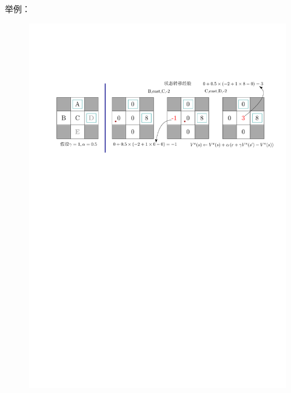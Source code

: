 \begin{example}
    举例：
    \begin{figure}[H]
        \centering
        \includegraphics[width = .8\textwidth]{image/时序差分学习.pdf}
    \end{figure}
\end{example}
